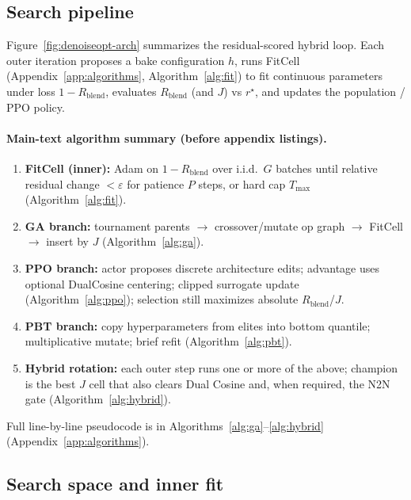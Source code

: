 \subsection{Search pipeline}
\label{sec:pipeline-overview}

Figure~\ref{fig:denoiseopt-arch} summarizes the residual-scored hybrid loop.
Each outer iteration proposes a bake configuration $h$, runs FitCell (Appendix~\ref{app:algorithms}, Algorithm~\ref{alg:fit}) to fit continuous parameters under loss $1-R_{\mathrm{blend}}$, evaluates $R_{\mathrm{blend}}$ (and $J$) vs $r^{\star}$, and updates the population / PPO policy.

\paragraph{Main-text algorithm summary (before appendix listings).}
\begin{enumerate}
  \item \textbf{FitCell (inner):} Adam on $1-R_{\mathrm{blend}}$ over i.i.d.\ $G$ batches until relative residual change $<\varepsilon$ for patience $P$ steps, or hard cap $T_{\max}$ (Algorithm~\ref{alg:fit}).
  \item \textbf{GA branch:} tournament parents $\to$ crossover/mutate op graph $\to$ FitCell $\to$ insert by $J$ (Algorithm~\ref{alg:ga}).
  \item \textbf{PPO branch:} actor proposes discrete architecture edits; advantage uses optional DualCosine centering; clipped surrogate update (Algorithm~\ref{alg:ppo}); selection still maximizes absolute $R_{\mathrm{blend}}$/$J$.
  \item \textbf{PBT branch:} copy hyperparameters from elites into bottom quantile; multiplicative mutate; brief refit (Algorithm~\ref{alg:pbt}).
  \item \textbf{Hybrid rotation:} each outer step runs one or more of the above; champion is the best $J$ cell that also clears Dual Cosine and, when required, the N2N gate (Algorithm~\ref{alg:hybrid}).
\end{enumerate}
Full line-by-line pseudocode is in Algorithms~\ref{alg:ga}--\ref{alg:hybrid} (Appendix~\ref{app:algorithms}).



\subsection{Search space and inner fit}
\label{sec:search-space}

